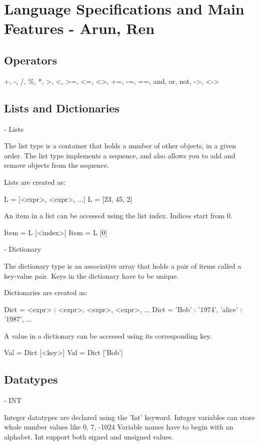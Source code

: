 \section{Language Specifications and Main Features - Arun, Ren}
\label{sect:spec}

\subsection{Operators}
+, -, /, \%, *, >, <, >=, <=, <>, +=, -=, ==, and, or, not, ->, <->

\subsection{Lists and Dictionaries}

- Lists

The list type is a container that holds a number of other objects, in a given order.
The list type implements a sequence, and also allows you to add and remove objects from the sequence.

Lists are created as:

L = [<expr>, <expr>, ...]
L = [23, 45, 2]

An item in a list can be accessed using the list index. Indices start from 0.

Item = L [<index>]
Item = L [0]



- Dictionary

The dictionary type is an associative array that holds a pair of items called a key-value pair.
Keys in the dictionary have to be unique.

Dictionaries are created as:

Dict = {<expr> : <expr>, <expr>, <expr>, ...}
Dict = { 'Bob' : '1974', 'alice' : '1987', ...}

A value in a dictionary can be accessed using its corresponding key.

Val = Dict [<key>]
Val = Dict ['Bob']




\subsection{Datatypes}

- INT

Integer datatypes are declared using the 'Int' keyword. Integer variables can store whole number values like 0, 7, -1024
Variable names have to begin with an alphabet. Int support both signed and unsigned values.

